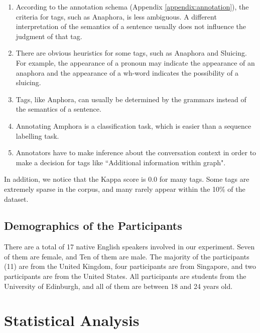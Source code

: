 \documentclass[bsc,frontabs,twoside,singlespacing,parskip,deptreport]{infthesis}     %
\begin{document}
\begin{enumerate}

    \item According to the annotation schema (Appendix \ref{appendix:annotation}), the criteria for tags, such as Anaphora, is less ambiguous. A different interpretation of the semantics of a sentence usually does not influence the judgment of that tag.
    
   \item There are obvious heuristics for some tags, such as Anaphora and Sluicing. For example, the appearance of a pronoun may indicate the appearance of an anaphora and the appearance of a wh-word indicates the possibility of a sluicing. 

   \item Tags, like Anphora, can usually be determined by the grammars instead of the semantics of a sentence.
   
   \item Annotating Amphora is a classification task, which is easier than a sequence labelling task.
   
   \item Annotators have to make inference about the conversation context in order to make a decision for tags like ``Additional information within graph".
   
\end{enumerate}

In addition, we notice that the Kappa score is 0.0 for many tags. Some tags are extremely sparse in the corpus, and many rarely appear within the 10\% of the dataset.

\subsection*{Demographics of the Participants}

There are a total of 17 native English speakers involved in our experiment. Seven of them are female, and Ten of them are male. The majority of the participants (11) are from the United Kingdom, four participants are from Singapore, and two participants are from the United States. All participants are students from the University of Edinburgh, and all of them are between 18 and 24 years old.

\section{Statistical Analysis}
\end{document}
